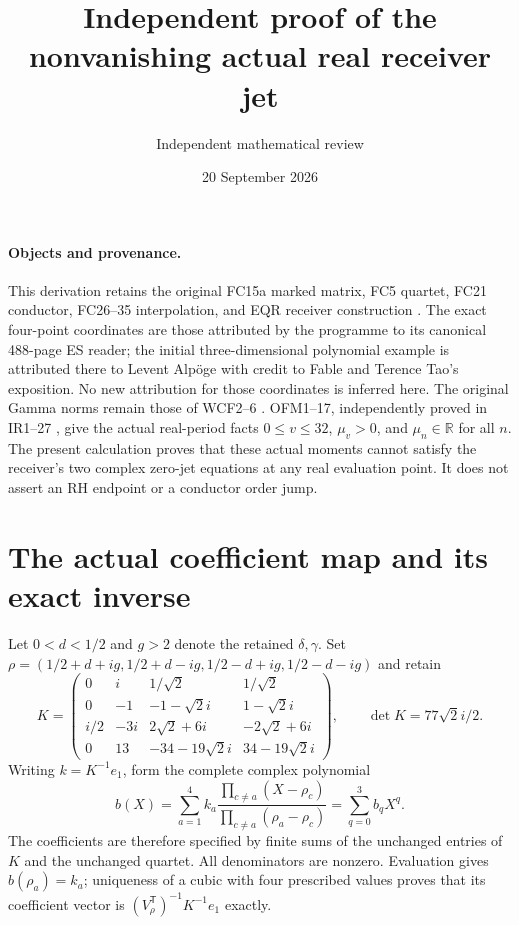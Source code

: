 \documentclass[11pt]{article}
\title{Independent proof of the nonvanishing actual real receiver jet}
\author{Independent mathematical review}
\date{20 September 2026}
\newcommand{\R}{\mathbb R}
\begin{document}
\maketitle

\paragraph{Objects and provenance.}
This derivation retains the original FC15a marked matrix, FC5 quartet,
FC21 conductor, FC26--35 interpolation, and EQR receiver construction
\cite{FC}. The exact four-point coordinates are those attributed by
the programme to its canonical 488-page ES reader; the initial
three-dimensional polynomial example is attributed there to Levent
Alp\"oge with credit to Fable and Terence Tao's exposition. No new
attribution for those coordinates is inferred here. The original
Gamma norms remain those of WCF2--6 \cite{WCF}. OFM1--17, independently
proved in IR1--27 \cite{OFMReview}, give the actual real-period facts
$0\le v\le32$, $\mu_v>0$, and $\mu_n\in\R$ for all $n$.
The present calculation proves that these actual moments cannot
satisfy the receiver's two complex zero-jet equations at any real
evaluation point. It does not assert an RH endpoint or a conductor
order jump.

\section{The actual coefficient map and its exact inverse}
Let $0<d<1/2$ and $g>2$ denote the retained $\delta,\gamma$.
Set $\rho=(1/2+d+ig,1/2+d-ig,1/2-d+ig,1/2-d-ig)$ and retain
\[
 K=\begin{pmatrix}
 0&i&1/\sqrt2&1/\sqrt2\\
 0&-1&-1-\sqrt2 i&1-\sqrt2 i\\
 i/2&-3i&2\sqrt2+6i&-2\sqrt2+6i\\
 0&13&-34-19\sqrt2 i&34-19\sqrt2 i
 \end{pmatrix},\qquad \det K=77\sqrt2 i/2.
 \tag{RJR1}
\]
Writing $k=K^{-1}e_1$, form the complete complex polynomial
\[
 b(X)=\sum_{a=1}^4k_a
 \frac{\prod_{c\ne a}(X-\rho_c)}{\prod_{c\ne a}(\rho_a-\rho_c)}
 =\sum_{q=0}^3b_qX^q.
 \tag{RJR2}
\]
The coefficients are therefore specified by finite sums of the
unchanged entries of $K$ and the unchanged quartet. All denominators
are nonzero. Evaluation gives $b(\rho_a)=k_a$; uniqueness of a cubic
with four prescribed values proves that its coefficient vector is
$(V_\rho^{\mathsf T})^{-1}K^{-1}e_1$ exactly.
\end{document}

